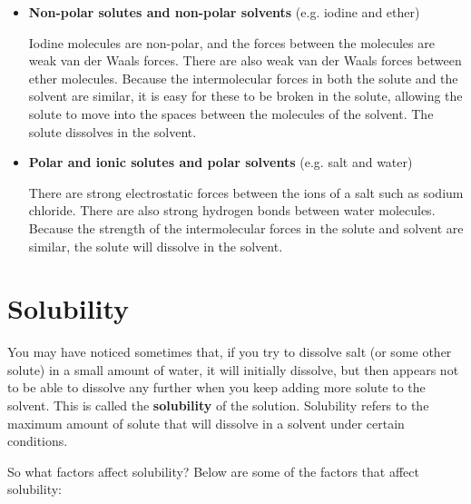 \begin{itemize}
\item{\textbf{Non-polar solutes and non-polar solvents} (e.g. iodine and ether)

Iodine molecules are non-polar, and the forces between the molecules are weak van der Waals forces. There are also weak van der Waals forces between ether molecules. Because the intermolecular forces in both the solute and the solvent are similar, it is easy for these to be broken in the solute, allowing the solute to move into the spaces between the molecules of the solvent. The solute dissolves in the solvent.\\}

\item{\textbf{Polar and ionic solutes and polar solvents} (e.g. salt and water})

There are strong electrostatic forces between the ions of a salt such as sodium chloride. There are also strong hydrogen bonds between water molecules. Because the strength of the intermolecular forces in the solute and solvent are similar, the solute will dissolve in the solvent. 
\end{itemize}

\section{Solubility}
\label{sec:soln:solubility}

You may have noticed sometimes that, if you try to dissolve salt (or some other solute) in a small amount of water, it will initially dissolve, but then appears not to be able to dissolve any further when you keep adding more solute to the solvent. This is called the \textbf{solubility} of the solution. Solubility refers to the maximum amount of solute that will dissolve in a solvent under certain conditions. 


So what factors affect solubility? Below are some of the factors that affect solubility:

